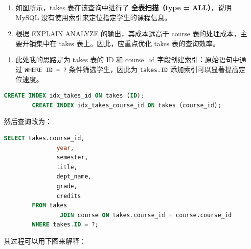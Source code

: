 \documentclass{article}
\begin{document}
	
	\begin{enumerate}[label=\textbullet]
		\item 如图所示，takes 表在该查询中进行了 \textbf{全表扫描（type = ALL）}，说明 MySQL 没有使用索引来定位指定学生的课程信息。
		
		\item 根据 EXPLAIN ANALYZE 的输出，其成本远高于 course 表的处理成本，主要开销集中在 takes 表上。因此，应重点优化 takes 表的查询效率。
	\end{enumerate}
	
	
	\begin{enumerate}[label=\textbullet]
		\item 此处我的思路是为 takes 表的 ID 和 course\_id 字段创建索引：原始语句中通过 \texttt{WHERE ID = ?} 条件筛选学生，因此为 \texttt{takes.ID} 添加索引可以显著提高定位速度。
		
	\end{enumerate}
	
	\clearpage
	
	
	\begin{lstlisting}[language=sql, title=student.name 上添加 全文索引（FULLTEXT）（针对模糊查询）, tabsize=4]
		CREATE INDEX idx_takes_id ON takes (ID);
		CREATE INDEX idx_takes_course_id ON takes (course_id);
	\end{lstlisting}
	
	然后查询改为：
	
	\begin{lstlisting}[language=sql, title=更新后的查询语句, tabsize=4]
		SELECT takes.course_id,
			   year,
			   semester,
			   title,
			   dept_name,
			   grade,
			   credits
		FROM takes
				JOIN course ON takes.course_id = course.course_id
		WHERE takes.ID = ?;
	\end{lstlisting}
	
	其过程可以用下图来解释：
	
\end{document}
